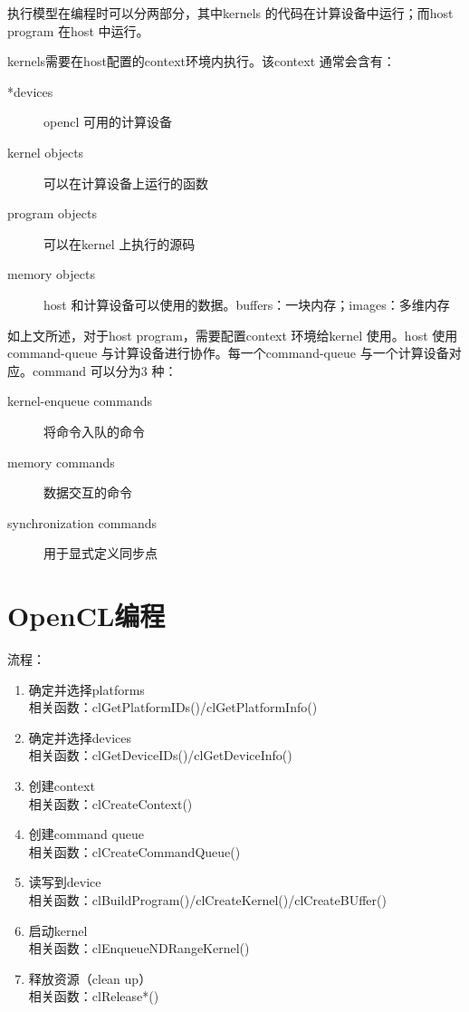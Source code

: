 \documentclass{ctexart}
\begin{document}
执行模型在编程时可以分两部分，其中kernels 的代码在计算设备中运行；而host program 在host 中运行。

kernels需要在host配置的context环境内执行。该context 通常会含有：
\begin{description}
  \item[*devices]opencl 可用的计算设备
  \item[kernel objects] 可以在计算设备上运行的函数
  \item[program objects] 可以在kernel 上执行的源码
  \item[memory objects]host 和计算设备可以使用的数据。buffers：一块内存；images：多维内存
\end{description}

如上文所述，对于host program，需要配置context 环境给kernel 使用。host 使用command-queue 与计算设备进行协作。每一个command-queue 与一个计算设备对应。command 可以分为3 种：
\begin{description}
  \item[kernel-enqueue commands] 将命令入队的命令
  \item[memory commands] 数据交互的命令
  \item[synchronization commands]用于显式定义同步点
\end{description}




\newpage
\section{OpenCL编程}
流程：
\begin{enumerate}
  \item 确定并选择platforms\\
        相关函数：clGetPlatformIDs()/clGetPlatformInfo()
  \item 确定并选择devices\\
        相关函数：clGetDeviceIDs()/clGetDeviceInfo()
  \item 创建context\\
        相关函数：clCreateContext()
  \item 创建command queue\\
        相关函数：clCreateCommandQueue()
  \item 读写到device\\
        相关函数：clBuildProgram()/clCreateKernel()/clCreateBUffer()
  \item 启动kernel\\
        相关函数：clEnqueueNDRangeKernel()
  \item 释放资源（clean up）\\
        相关函数：clRelease*()
\end{enumerate}
\end{document}
